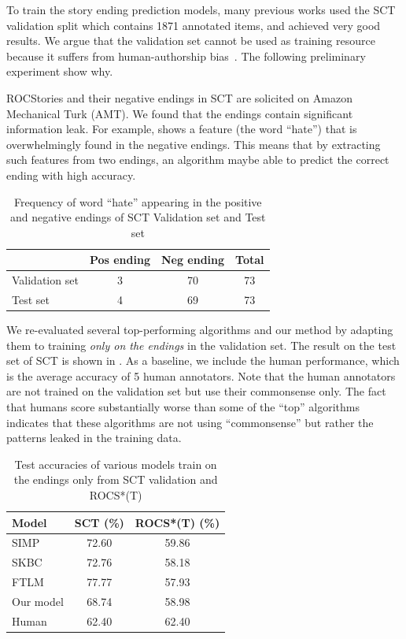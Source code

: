 To train the story ending prediction models, many previous works
used the SCT validation split which contains 1871 annotated items,
and achieved very good results.
We argue that the validation set cannot be used as training resource because
it suffers from human-authorship bias~\cite{sharma2018tackling}.  
The following preliminary experiment show why. 

ROCStories and their negative endings in SCT are solicited
on Amazon Mechanical Turk (AMT). We found that the endings
contain significant information leak. For example, 
shows a feature (the word ``hate'') that is overwhelmingly found 
in the negative endings.
This means that by extracting such features from two endings, an algorithm
maybe able to predict the correct ending with high accuracy. 

\begin{table}[th!]
\small
\centering
\begin{tabular}{lccc}
\hline
  & Pos ending& Neg ending &Total\\
\hline
Validation set & 3  & 70 &73\\
Test set          & 4  & 69 &73\\
\hline
\end{tabular}
\caption{Frequency of word ``hate'' appearing in the positive and 
negative endings of SCT Validation set and Test set}
\label{tab:hate}
\end{table}

We re-evaluated several top-performing algorithms and our method
by adapting them to training {\em only on the endings} in the validation set. 
The result on the test set of SCT is shown in . 
As a baseline, we include the human performance, which is the average
accuracy of 5 human annotators. Note that the human annotators are not
trained on the validation set but use their commonsense only. The fact
that humans score substantially worse than some of the ``top'' algorithms
indicates that these algorithms are not using ``commonsense'' but rather
the patterns leaked in the training data. 

\begin{table}[th!]
\small
\centering
\begin{tabular}{lcc}
\hline
\textbf{Model}& SCT (\%) &ROCS*(T) (\%)\\
\hline
SIMP& 72.60 &59.86\\
SKBC&72.76&58.18\\
FTLM& 77.77 &57.93\\
Our model& 68.74&58.98\\
\hline
Human& 62.40&62.40\\
\hline
\end{tabular}
\caption{Test accuracies of various models train on the endings only
from SCT validation and ROCS*(T)}
\label{tab:end}
\end{table}

